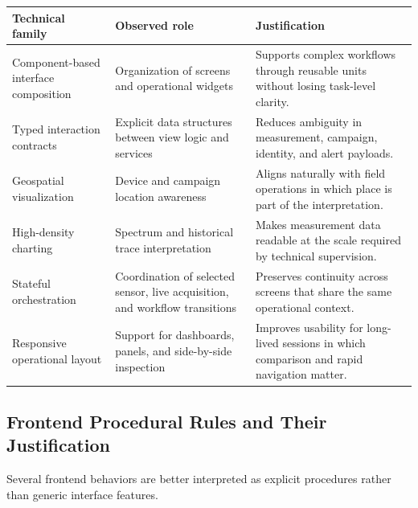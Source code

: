 \documentclass[11pt,a4paper]{article}
\begin{document}
\begin{longtable}{@{}p{}p{}p{}@{}}
\toprule
\textbf{Technical family} & \textbf{Observed role} & \textbf{Justification} \\
\midrule
\endhead
Component-based interface composition & Organization of screens and operational widgets & Supports complex workflows through reusable units without losing task-level clarity. \\
Typed interaction contracts & Explicit data structures between view logic and services & Reduces ambiguity in measurement, campaign, identity, and alert payloads. \\
Geospatial visualization & Device and campaign location awareness & Aligns naturally with field operations in which place is part of the interpretation. \\
High-density charting & Spectrum and historical trace interpretation & Makes measurement data readable at the scale required by technical supervision. \\
Stateful orchestration & Coordination of selected sensor, live acquisition, and workflow transitions & Preserves continuity across screens that share the same operational context. \\
Responsive operational layout & Support for dashboards, panels, and side-by-side inspection & Improves usability for long-lived sessions in which comparison and rapid navigation matter. \\
\bottomrule
\end{longtable}

\subsection{Frontend Procedural Rules and Their Justification}
Several frontend behaviors are better interpreted as explicit procedures rather than generic interface features.
\end{document}
